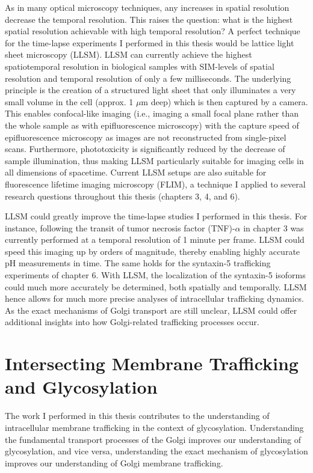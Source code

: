 As in many optical microscopy techniques, any increases in spatial resolution decrease the temporal resolution. This raises the question: what is the highest spatial resolution achievable with high temporal resolution? A perfect technique for the time-lapse experiments I performed in this thesis would be lattice light sheet microscopy (LLSM)\cite{chen_lattice_2014}. LLSM can currently achieve the highest spatiotemporal resolution in biological samples with SIM-levels of spatial resolution and temporal resolution of only a few milliseconds\cite{chen_lattice_2014}. The underlying principle is the creation of a structured light sheet that only illuminates a very small volume in the cell (approx. 1 $\mu$m deep) which is then captured by a camera. This enables confocal-like imaging (i.e., imaging a small focal plane rather than the whole sample as with epifluorescence microscopy) with the capture speed of epifluorescence microscopy as images are not reconstructed from single-pixel scans. Furthermore, phototoxicity is significantly reduced by the decrease of sample illumination, thus making LLSM particularly suitable for imaging cells in all dimensions of spacetime. Current LLSM setups are also suitable for fluorescence lifetime imaging microscopy (FLIM)\cite{hirvonen_lightsheet_2020}, a technique I applied to several research questions throughout this thesis (chapters 3, 4, and 6).

LLSM could greatly improve the time-lapse studies I performed in this thesis. For instance, following the transit of tumor necrosis factor (TNF)-$\alpha$ in chapter 3 was currently performed at a temporal resolution of 1 minute per frame. LLSM could speed this imaging up by orders of magnitude, thereby enabling highly accurate pH measurements in time. The same holds for the syntaxin-5 trafficking experiments of chapter 6. With LLSM, the localization of the syntaxin-5 isoforms could much more accurately be determined, both spatially and temporally. LLSM hence allows for much more precise analyses of intracellular trafficking dynamics. As the exact mechanisms of Golgi transport are still unclear, LLSM could offer additional insights into how Golgi-related trafficking processes occur.


\section{Intersecting Membrane Trafficking and Glycosylation}

The work I performed in this thesis contributes to the understanding of intracellular membrane trafficking in the context of glycosylation. Understanding the fundamental transport processes of the Golgi improves our understanding of glycosylation, and vice versa, understanding the exact mechanism of glycosylation improves our understanding of Golgi membrane trafficking. 

